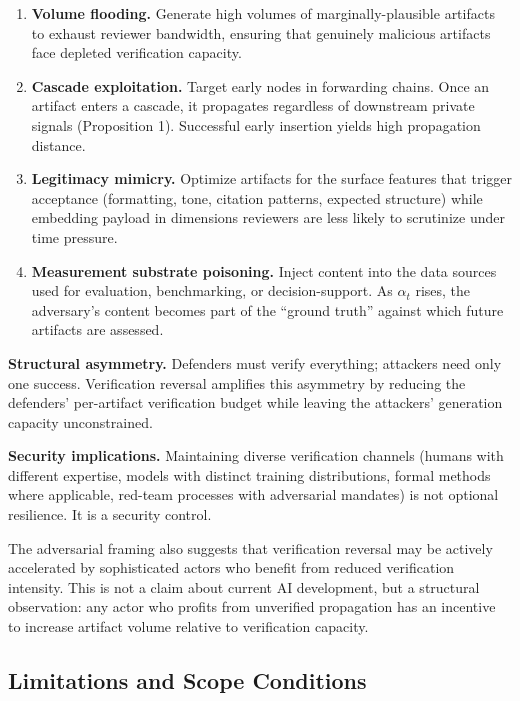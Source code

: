 \documentclass[11pt,a4paper]{article}
\providecommand{\tightlist}{\setlength{\itemsep}{0pt}\setlength{\parskip}{0pt}}
\begin{document}
\begin{enumerate}
\def\labelenumi{\arabic{enumi}.}
\tightlist
\item
  \textbf{Volume flooding.} Generate high volumes of marginally-plausible artifacts to exhaust reviewer bandwidth, ensuring that genuinely malicious artifacts face depleted verification capacity.
\item
  \textbf{Cascade exploitation.} Target early nodes in forwarding chains. Once an artifact enters a cascade, it propagates regardless of downstream private signals (Proposition 1). Successful early insertion yields high propagation distance.
\item
  \textbf{Legitimacy mimicry.} Optimize artifacts for the surface features that trigger acceptance (formatting, tone, citation patterns, expected structure) while embedding payload in dimensions reviewers are less likely to scrutinize under time pressure.
\item
  \textbf{Measurement substrate poisoning.} Inject content into the data sources used for evaluation, benchmarking, or decision-support. As $\alpha_{t}$ rises, the adversary's content becomes part of the ``ground truth'' against which future artifacts are assessed.
\end{enumerate}

\textbf{Structural asymmetry.} Defenders must verify everything; attackers need only one success. Verification reversal amplifies this asymmetry by reducing the defenders' per-artifact verification budget while leaving the attackers' generation capacity unconstrained.

\textbf{Security implications.} Maintaining diverse verification channels (humans with different expertise, models with distinct training distributions, formal methods where applicable, red-team processes with adversarial mandates) is not optional resilience. It is a security control.

The adversarial framing also suggests that verification reversal may be actively accelerated by sophisticated actors who benefit from reduced verification intensity. This is not a claim about current AI development, but a structural observation: any actor who profits from unverified propagation has an incentive to increase artifact volume relative to verification capacity.

\hypertarget{limitations-and-scope-conditions}{%
\subsection{ Limitations and Scope Conditions}\label{limitations-and-scope-conditions}}
\end{document}
